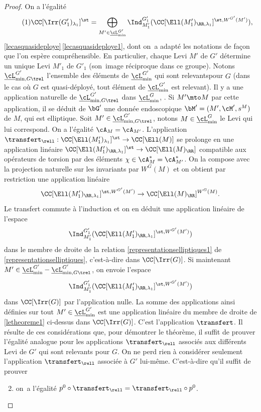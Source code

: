 \begin{proof}
On a l'égalité
\begin{equation}\tag{1}\label{letheoreme1}
\CC[\Irr(G'_{1})_{\lambda_{1}}]^{\st}=\bigoplus_{M'\in \underline{\cL}_{\min}^{G'}}\Ind_{M'_{1}}^{G'_{1}}(\CC[\Ell(M'_{1})_{\RR,\lambda_{1}}]^{\st,W^{G'}(M')}),
\end{equation}
\cf \ref{lecasquasideploye}\,\eqref{lecasquasideploye1}, dont on~a adapté les notations de façon que l'on espère compréhensible. En particulier, chaque Levi $M'$ de $G'$ détermine un unique Levi $M'_{1}$ de $G'_{1}$ (son~image réciproque dans ce groupe). Notons $\underline{\cL}_{\min,G\trel}^{G'}$ l'ensemble des éléments de $\underline{\cL}_{\min}^{G'}$ qui sont \og relevants\fg pour $G$ (dans le cas où $G$ est quasi-déployé, tout élément de $\underline{\cL}_{\min}^{G'}$ est relevant). Il y a une application naturelle
de $\underline{\cL}_{\min,G\trel}^{G'}$ dans $\underline{\cL} _{\min}^G$, \cf \hbox{\cite[1.3.4]{MW}}. Si $M'\mto M$ par cette application, il se déduit de $\bG'$ une donnée endoscopique $\bM'=(M',\cM',s^M)$ de $M$, qui est elliptique.
Soit $M'\in \underline{\cL}_{\min,G\trel}^{G'}$, notons $M\in \underline{\cL} _{\min}^G$ le Levi qui lui correspond. On a l'égalité $\cA_{M}=\cA_{M'}$. L'application $\transfert_{\rell}: \CC[\Ell(M'_{1})_{\lambda_{1}}]^{\st}\to \CC[\Ell(M)]$ se prolonge en une application linéaire
$\CC[\Ell(M'_{1})_{\RR,\lambda_{1}}]^{\st}\to \CC[\Ell(M)_{\RR}]$ compatible aux opérateurs de torsion par des éléments $\chi\in \cA_{M}^*=\cA_{M'}^*$. On la compose avec la projection naturelle sur les invariants par $W^G(M)$ et on obtient par restriction une application linéaire
\[
\CC[\Ell(M'_{1})_{\RR,\lambda_{1}}]^{\st,W^{G'}(M')}\to \CC[\Ell(M)_{\RR}]^{W^G(M)}.
\]
Le transfert commute à l'induction et on en déduit une application linéaire de l'espace
\[
\Ind_{M'_{1}}^{G'_{1}}(\CC[\Ell(M'_{1})_{\RR,\lambda_{1}}]^{\st,W^{G'}(M')})
\]
dans le membre de droite de la relation \eqref{representationselliptiques1} de \ref{representationselliptiques}, c'est-à-dire dans $ \CC[\Irr(G)]$. Si maintenant $M'\in \underline{\cL}_{\min}^{G'}-\underline{\cL}_{\min,G\trel}^{G'}$, on envoie l'espace
\[
\Ind_{M'_{1}}^{G'_{1}}(\CC[\Ell(M'_{1})_{\RR,\lambda_{1}}]^{\st,W^{G'}(M')})
\]
dans $ \CC[\Irr(G)]$ par l'application nulle. La somme des applications ainsi définies sur tout $M'\in \underline{\cL}_{\min}^{G'}$ est une application linéaire du membre de droite de \eqref{letheoreme1} ci-dessus dans $ \CC[\Irr(G)]$. C'est
l'application $\transfert$. Il résulte de ces considérations que, pour démontrer le théorème, il suffit de prouver l'égalité analogue pour les applications $\transfert_{\rell}$ associés aux différents Levi de $G'$ qui sont relevants pour $G$. On ne perd rien à considérer seulement l'application $\transfert_{\rell}$ associée à $G'$ lui-même. C'est-à-dire qu'il suffit de prouver
\begin{enumerate}\setcounter{enumi}{1}
\item\label{letheoreme2}
on~a l'égalité $p^0\circ \transfert_{\rell}=\transfert_{\rell}\circ p^0$.
\end{enumerate}


\end{proof}
